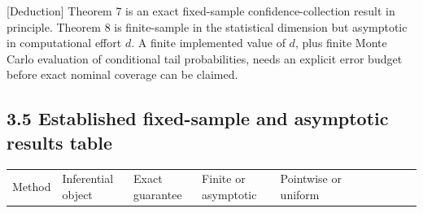 \documentclass[
  english,
  11pt,
  a4paper,
]{article}
\newcounter{none} %
\begin{document}
{[}Deduction{]} Theorem 7 is an exact fixed-sample confidence-collection
result in principle. Theorem 8 is finite-sample in the statistical
dimension but asymptotic in computational effort $d$. A finite
implemented value of $d$, plus finite Monte Carlo evaluation of
conditional tail probabilities, needs an explicit error budget before
exact nominal coverage can be claimed.

\subsection{3.5 Established fixed-sample and asymptotic results
table}\label{established-fixed-sample-and-asymptotic-results-table}

{\def\LTcaptype{none} %
\begin{landscape}
\scriptsize
\begin{longtable}[]{@{}
  >{\raggedright\arraybackslash}p{}
  >{\raggedright\arraybackslash}p{}
  >{\raggedright\arraybackslash}p{}
  >{\raggedright\arraybackslash}p{}
  >{\raggedright\arraybackslash}p{}
  >{\raggedright\arraybackslash}p{}
  >{\raggedright\arraybackslash}p{}
  >{\raggedright\arraybackslash}p{}
  >{\raggedright\arraybackslash}p{}
  >{\raggedright\arraybackslash}p{}
  >{\raggedright\arraybackslash}p{}@{}}
\toprule\noalign{}
\begin{minipage}[b]{\linewidth}\raggedright
Method
\end{minipage} & \begin{minipage}[b]{\linewidth}\raggedright
Inferential object
\end{minipage} & \begin{minipage}[b]{\linewidth}\raggedright
Exact guarantee
\end{minipage} & \begin{minipage}[b]{\linewidth}\raggedright
Finite or asymptotic
\end{minipage} & \begin{minipage}[b]{\linewidth}\raggedright
Pointwise or uniform
\end{minipage} & \begin{minipage}[b]{\linewidth}\raggedright

\end{minipage}
\end{longtable}
\end{landscape}}
\end{document}
